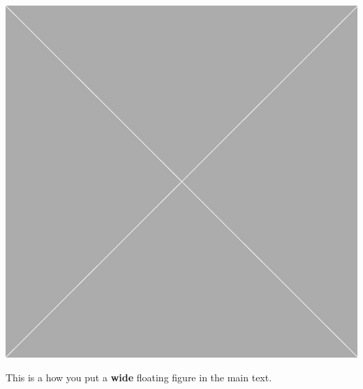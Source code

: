 \documentclass[10pt,oneside]{book}
\begin{document}
\begin{widefigure}
  \centering
  \includegraphics[width=\linewidth]{Pictures/placeholder.jpg}
  \caption{This is a how you put a \textbf{wide} floating figure in the main text.}
\end{widefigure}
\end{document}

